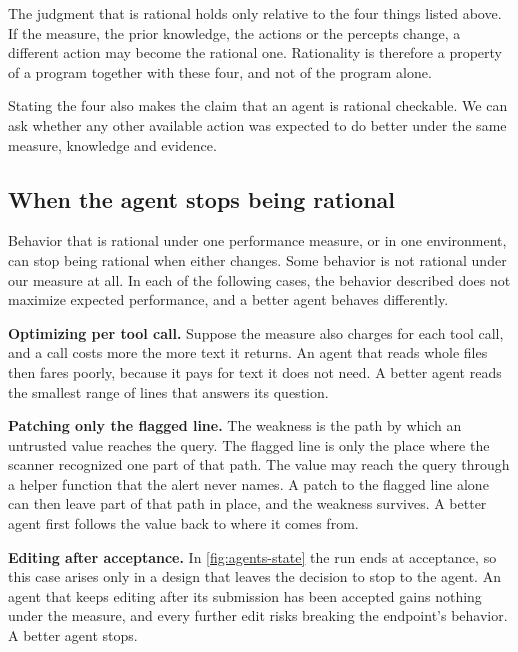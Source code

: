 The judgment that \msa{} is rational holds only relative to the four things listed above. If the
measure, the prior knowledge, the actions or the percepts change, a different action may become
the rational one. Rationality is therefore a property of a program together with these four, and
not of the program alone.

Stating the four also makes the claim that an agent is rational checkable. We can ask whether any
other available action was expected to do better under the same measure, knowledge and evidence.

\subsection{When the agent stops being rational}
\label{sec:agents-not-rational}

Behavior that is rational under one performance measure, or in one environment, can stop being
rational when either changes. Some behavior is not rational under our measure at all. In each of
the following cases, the behavior described does not maximize expected performance, and a better
agent behaves differently.
\bi
\item \textbf{Optimizing per tool call.} Suppose the measure also charges for each tool call, and a
call costs more the more text it returns. An agent that reads whole files then fares poorly,
because it pays for text it does not need. A better agent reads the smallest range of lines that
answers its question.
\item \textbf{Patching only the flagged line.} The weakness is the path by which an untrusted value
reaches the query. The flagged line is only the place where the scanner recognized one part of
that path. The value may reach the query through a helper function that the alert never names. A
patch to the flagged line alone can then leave part of that path in place, and the weakness
survives. A better agent first follows the value back to where it comes from.
\item \textbf{Editing after acceptance.} In \cref{fig:agents-state} the run ends at acceptance, so
this case arises only in a design that leaves the decision to stop to the agent. An agent that
keeps editing after its submission has been accepted gains nothing under the measure, and every
further edit risks breaking the endpoint's behavior. A better agent stops.
\ei


